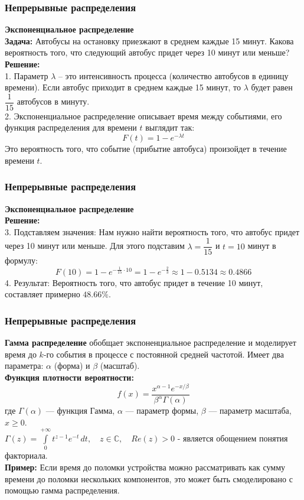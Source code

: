 \documentclass[aspectratio=169]{beamer}
\begin{document}
\begin{frame}
\frametitle{Непрерывные распределения}
{\bf Экспоненциальное распределение}\\
{\bf Задача:} Автобусы на остановку приезжают в среднем каждые 15 минут. Какова вероятность того, что следующий автобус придет через 10 минут или меньше?\\
{\bf Решение:}\\
1. Параметр $\lambda$ -- это интенсивность процесса (количество автобусов в единицу времени). Если автобус приходит в среднем каждые 15 минут, то $\lambda$ будет равен $\dfrac{1}{15}$ автобусов в минуту.\\
2. Экспоненциальное распределение описывает время между событиями, его функция распределения для времени $t$ выглядит так:\\
$$F(t) = 1 - e^{-\lambda t}$$
Это вероятность того, что событие (прибытие автобуса) произойдет в течение времени $t$.
\end{frame}

\begin{frame}
\frametitle{Непрерывные распределения}
{\bf Экспоненциальное распределение}\\
{\bf Решение:}\\
3. Подставляем значения: Нам нужно найти вероятность того, что автобус придет через 10 минут или меньше. Для этого подставим $\lambda = \dfrac{1}{15}$ и $t = 10$ минут в формулу:
$$F(10)=1 - e^{-\frac{1}{15}\cdot 10} = 1 - e^{-\frac{2}{3}} \approx 1 - 0.5134 \approx 0.4866$$
4. Результат: Вероятность того, что автобус придет в течение 10 минут, составляет примерно $48.66\%$.
\end{frame}

\begin{frame}
\frametitle{Непрерывные распределения}
{\bf Гамма распределение} обобщает экспоненциальное распределение и моделирует время до \( k \)-го события в процессе с постоянной средней частотой. Имеет два параметра: \( \alpha \) (форма) и \( \beta \) (масштаб).\\
{\bf Функция плотности вероятности:}
  \[
  f(x) = \frac{x^{\alpha - 1} e^{-x / \beta}}{\beta^{\alpha} \Gamma(\alpha)}
  \]
где \( \Gamma(\alpha) \) — функция Гамма, \( \alpha \) — параметр формы, \( \beta \) — параметр масштаба, \( x \geq 0 \).\\
$\Gamma (z)=\int \limits _{0}^{+\infty }t^{z-1}e^{-t}\,dt,\quad z\in \mathbb {C} ,\quad  Re(z)>0$ - является обощением понятия факториала.\\
{\bf Пример:} Если время до поломки устройства можно рассматривать как сумму времени до поломки нескольких компонентов, это может быть смоделировано с помощью гамма распределения.
\end{frame}
\end{document}
